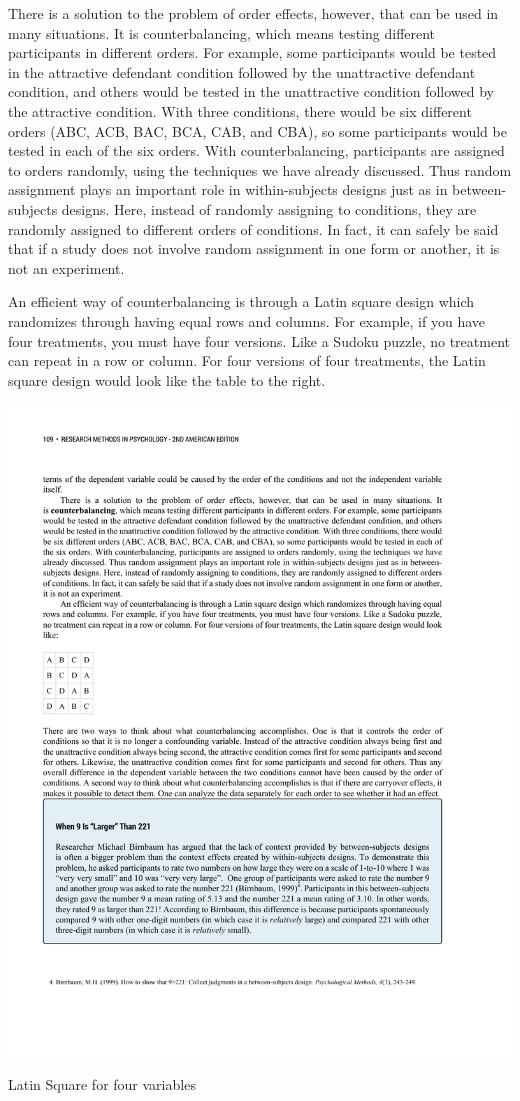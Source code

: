 There is a solution to the problem of order effects, however, that can be used in many situations. It is counterbalancing, which means testing different participants in different orders. For example, some participants would be tested in the attractive defendant condition followed by the unattractive defendant condition, and others would be tested in the unattractive condition followed by the attractive condition. With three conditions, there would be six different orders (ABC, ACB, BAC, BCA, CAB, and CBA), so some participants would be tested in each of the six orders. With counterbalancing, participants are assigned to orders randomly, using the techniques we have already discussed. Thus random assignment plays an important role in within-subjects designs just as in between- subjects designs. Here, instead of randomly assigning to conditions, they are randomly assigned to different orders of conditions. In fact, it can safely be said that if a study does not involve random assignment in one form or another, it is not an experiment.

An efficient way of counterbalancing is through a Latin square design which randomizes through having equal rows and columns. For example, if you have four treatments, you must have four versions. Like a Sudoku puzzle, no treatment can repeat in a row or column. For four versions of four treatments, the Latin square design would look like the table to the right.

\begin{marginfigure}[0in]
\includegraphics[width=\linewidth]{figures/C6counterbalance.pdf}
\caption{Latin Square for four variables}
\label{fig:latin}
\end{marginfigure}

